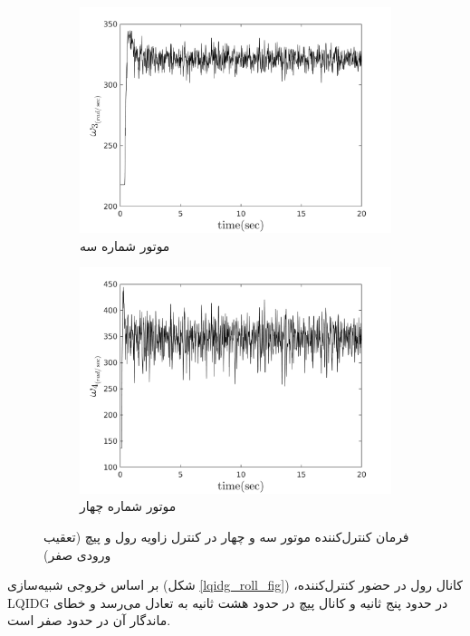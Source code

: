 \begin{figure}
	[width=12cm]
	\centering
	\begin{subfigure}
		\centering
		\includegraphics[width=12cm]{../Figures/MIL/LQIDG/Roll_Pitch/lqidg_roll_pitch_Omega_3.png}
		\caption{موتور شماره سه}
	\end{subfigure}
	\begin{subfigure}
		\centering
		\includegraphics[width=12cm]{../Figures/MIL/LQIDG/Roll_Pitch/lqidg_roll_pitch_Omega_4.png}
		\caption{موتور شماره چهار}
	\end{subfigure}
	\caption{‫‪فرمان کنترل‌کننده موتور سه و چهار در کنترل زاویه رول و پیچ (تعقیب ورودی صفر)}
\end{figure}


بر اساس خروجی شبیه‌سازی (شکل
\ref{lqidg_roll_fig})
،کانال رول در حضور کنترل‌کننده LQIDG در حدود پنج ثانیه و کانال پیچ در حدود هشت ثانیه به تعادل می‌رسد و خطای ماندگار آن در حدود صفر است.